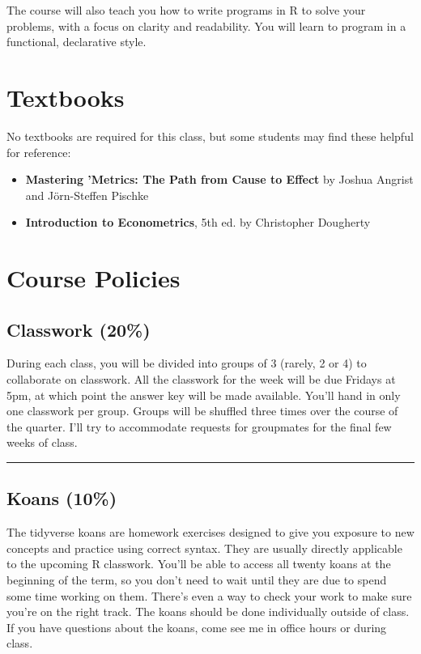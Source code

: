 \documentclass[11pt]{article}
\begin{document}
The course will also teach you how to write programs in R to solve your problems, with a focus on clarity and readability. You will learn to program in a functional, declarative style.

\section*{Textbooks}
\label{sec:orgbdabc0f}

No textbooks are required for this class, but some students may find these helpful for reference:

\begin{itemize}
\item \textbf{Mastering 'Metrics: The Path from Cause to Effect} by Joshua Angrist and Jörn-Steffen Pischke

\item \textbf{Introduction to Econometrics}, 5th ed. by Christopher Dougherty
\end{itemize}

\section*{Course Policies}
\label{sec:orgb96d568}

\subsection*{Classwork (20\%)}
\label{sec:orgf31bf6e}

During each class, you will be divided into groups of 3 (rarely, 2 or 4) to collaborate on classwork.
All the classwork for the week will be due Fridays at 5pm, at which point the answer key will be made available. You'll hand in only one classwork per group. Groups will be shuffled three times over the course of the quarter. I'll try to accommodate requests for groupmates for the final few weeks of class.

\noindent\rule{\textwidth}{0.5pt}

\subsection*{Koans (10\%)}
\label{sec:org1232329}

The tidyverse koans are homework exercises designed to give you exposure to new concepts and practice using correct syntax. They are usually directly applicable to the upcoming R classwork. You'll be able to access all twenty koans at the beginning of the term, so you don't need to wait until they are due to spend some time working on them. There's even a way to check your work to make sure you're on the right track. The koans should be done individually outside of class. If you have questions about the koans, come see me in office hours or during class.
\end{document}
